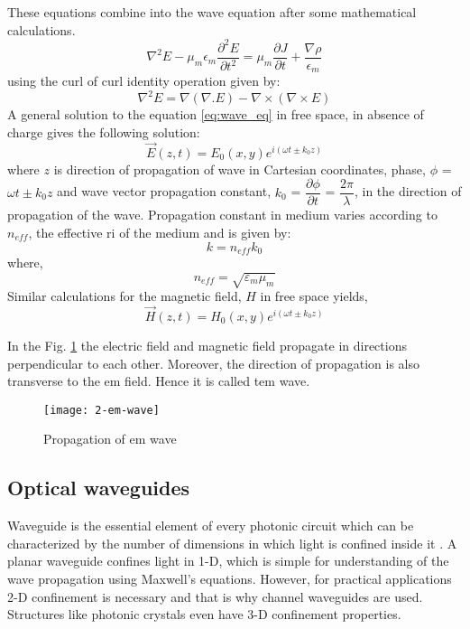 \documentclass[../report.tex]{subfiles}
\begin{document}
\noindent These equations combine into the wave equation after some mathematical calculations.
\begin{equation}\label{eq:wave_eq}
\nabla^2 E -  \mu_m\epsilon_m\frac{\partial^2 E}{\partial t^2} = \mu_m\frac{\partial J}{\partial t} + \frac{\nabla\rho}{\epsilon_m}	
\end{equation}
using the curl of curl identity operation given by: 
\begin{equation}\label{eq:curl_of_curl}
\nabla^2 E = \nabla(\nabla.E) - \nabla\times(\nabla\times E)
\end{equation}
A general solution to the equation \ref{eq:wave_eq} in free space, in absence of charge gives the following solution:
\begin{equation}\label{eq:wave_sol_electric}
\overrightarrow{E}(z,t)=E_{0}(x,y)e^{i\left(\omega t \pm k_{0}z\right)}
\end{equation}
where $z$ is direction of propagation of wave in Cartesian coordinates, phase, $\phi$ = $\omega t \pm k_{0}z$ and wave vector propagation constant, $k_0$ = $\dfrac {\partial \phi } {\partial t}$ = $\dfrac {2\pi } {\lambda }$, in the direction of propagation of the wave. Propagation constant in medium varies according to $n_{eff}$, the effective \gls{ri} of the medium and is given by: 
\begin{equation}\label{eq:propagation_const_med_val}
k = n_{eff}k_0
\end{equation}
where,
\begin{equation}\label{eq:ri_med_val}
n_{eff} = \sqrt {\varepsilon _{m}\mu _{m}}
\end{equation}
Similar calculations for the magnetic field, $H$ in free space yields, 		
\begin{equation}\label{eq:wave_sol_magnetic}
\overrightarrow{H}(z,t)=H_{0}(x,y)e^{i\left(\omega t \pm k_{0}z\right)}
\end{equation}

\noindent In the Fig. \ref{fig:2_em_wave} the electric field and magnetic field propagate in directions perpendicular to each other. Moreover, the direction of propagation is also transverse to the \gls{em} field. Hence it is called \gls{tem} wave.
\begin{figure}[H]
	\centering
	\texttt{[image: 2-em-wave]}
	\caption{Propagation of \gls{em} wave}
	\label{fig:2_em_wave}
\end{figure}
		\subsection{Optical waveguides}
Waveguide is the essential element of every photonic circuit which can be characterized by the number of dimensions in which light is confined inside it \cite{reed_silicon_2008}. A planar waveguide confines light in 1-D, which is simple for understanding of the wave propagation using Maxwell's equations. However, for practical applications 2-D confinement is necessary and that is why channel waveguides are used. Structures like photonic crystals even have 3-D confinement properties.   			
\end{document}
